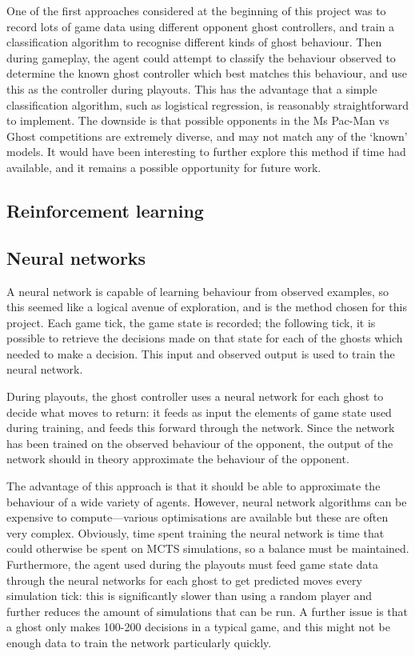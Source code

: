 One of the first approaches considered at the beginning of this project was to record lots of game data using different opponent ghost controllers, and train a classification algorithm to recognise different kinds of ghost behaviour.  Then during gameplay, the agent could attempt to classify the behaviour observed to determine the known ghost controller which best matches this behaviour, and use this as the controller during playouts.  This has the advantage that a simple classification algorithm, such as logistical regression, is reasonably straightforward to implement.  The downside is that possible opponents in the Ms Pac-Man vs Ghost competitions are extremely diverse, and may not match any of the `known' models.  It would have been interesting to further explore this method if time had available, and it remains a possible opportunity for future work.

\subsection{Reinforcement learning}


\subsection{Neural networks}

A neural network is capable of learning behaviour from observed examples, so this seemed like a logical avenue of exploration, and is the method chosen for this project.  Each game tick, the game state is recorded; the following tick, it is possible to retrieve the decisions made on that state for each of the ghosts which needed to make a decision.  This input and observed output is used to train the neural network.

During playouts, the ghost controller uses a neural network for each ghost to decide what moves to return: it feeds as input the elements of game state used during training, and feeds this forward through the network.  Since the network has been trained on the observed behaviour of the opponent, the output of the network should in theory approximate the behaviour of the opponent.

The advantage of this approach is that it should be able to approximate the behaviour of a wide variety of agents.  However, neural network algorithms can be expensive to compute---various optimisations are available but these are often very complex.  Obviously, time spent training the neural network is time that could otherwise be spent on MCTS simulations, so a balance must be maintained.  Furthermore, the agent used during the playouts must feed game state data through the neural networks for each ghost to get predicted moves every simulation tick: this is significantly slower than using a random player and further reduces the amount of simulations that can be run.  A further issue is that a ghost only makes 100-200 decisions in a typical game, and this might not be enough data to train the network particularly quickly.

